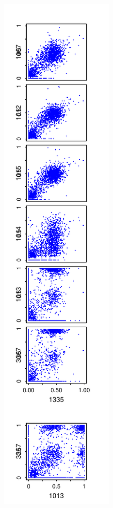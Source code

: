 \documentclass{article}\usepackage[]{graphicx}\usepackage[]{color}
\begin{document}
\includegraphics{Fig1-mscat-figs/6+1julie1F.pdf}%
\end{document}
